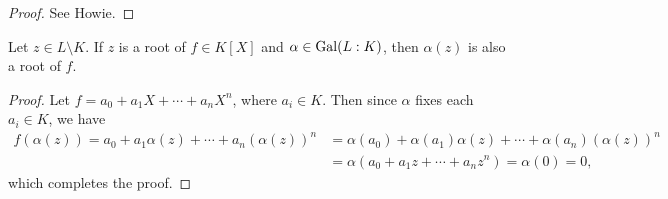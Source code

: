 \begin{proof}
  See Howie.
\end{proof}

\begin{theorem}
  Let $z \in L \setminus K$. If $z$ is a root of
  $f \in K[X]$ and $\alpha \in \operatorname{Gal}(L : K)$, then
  $\alpha(z)$ is also a root of $f$.
\end{theorem}

\begin{proof}
  Let $f = a_0 + a_1X + \cdots + a_nX^n$, where
  $a_i \in K$. Then since $\alpha$ fixes each
  $a_i \in K$, we have
  \begin{align*}
    f(\alpha(z))
    = a_0 + a_1\alpha(z) + \cdots + a_n(\alpha(z))^n
    &= \alpha(a_0) + \alpha(a_1)\alpha(z) + \cdots + \alpha(a_n)(\alpha(z))^n \\
    &= \alpha(a_0 + a_1z + \cdots + a_nz^n)
    = \alpha(0) = 0,
  \end{align*}
  which completes the proof.
\end{proof}

